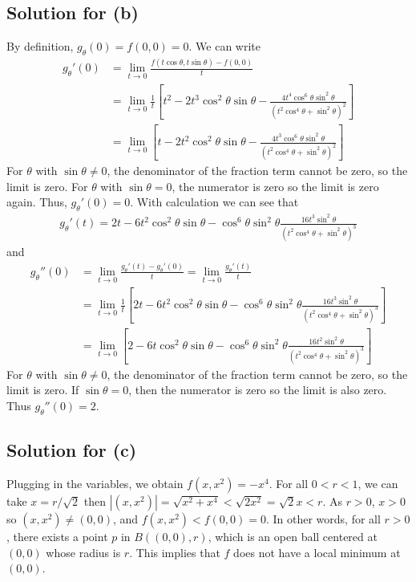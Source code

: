 \documentclass{scrartcl}
\begin{document}
\subsection{Solution for (b)}
By definition, \(g_\theta(0) = f(0, 0) = 0\). We can write
\begin{align*}
  g_\theta'(0)
  &= \lim_{t \to 0} \frac{f(t \cos \theta, t \sin \theta) - f(0, 0)}{t} \\
  &= \lim_{t \to 0}
    \frac{1}{t}
      \left[ t^2 - 2t^3 \cos^2 \theta \sin \theta
        - \frac{4t^4 \cos^6 \theta \sin^2 \theta}
        {(t^2 \cos^4 \theta + \sin^2 \theta)^2} \right] \\
  &= \lim_{t \to 0}
    \left[ t - 2t^2 \cos^2 \theta \sin \theta
      - \frac{4t^3 \cos^6 \theta \sin^2 \theta}
        {(t^2 \cos^4 \theta + \sin^2 \theta)^2}\right]
\end{align*}
For \(\theta\) with \(\sin \theta \not = 0\), the denominator of the fraction
term cannot be zero, so the limit is zero. For \(\theta\) with \(\sin \theta =
0\), the numerator is zero so the limit is zero again. Thus, \(g_\theta'(0) =
0\). With calculation we can see that
\begin{align*}
  g_\theta'(t)
  = 2t - 6t^2 \cos^2 \theta \sin \theta - \cos^6 \theta \sin^2 \theta
    \frac{16t^3 \sin^2 \theta}{(t^2 \cos^4 \theta + \sin^2 \theta)^3}
\end{align*}
and
\begin{align*}
  g_\theta''(0)
  &= \lim_{t \to 0} \frac{g_\theta'(t) - g_\theta'(0)}{t}
  = \lim_{t \to 0} \frac{g_\theta'(t)}{t} \\
  &= \lim_{t \to 0} \frac{1}{t}
    \left[ 2t - 6t^2 \cos^2 \theta \sin \theta - \cos^6 \theta \sin^2 \theta
      \frac{16t^3 \sin^2 \theta}
      {(t^2 \cos^4 \theta + \sin^2 \theta)^3} \right] \\
  &= \lim_{t \to 0}
    \left[ 2 - 6t \cos^2 \theta \sin \theta - \cos^6 \theta \sin^2 \theta
      \frac{16t^2 \sin^2 \theta}{(t^2 \cos^4 \theta + \sin^2 \theta)^3} \right]
\end{align*}
For \(\theta\) with \(\sin \theta \not = 0\), the denominator of the fraction
term cannot be zero, so the limit is zero. If \(\sin \theta = 0\), then the
numerator is zero so the limit is also zero. Thus \(g_\theta''(0) = 2\).

\subsection{Solution for (c)}
Plugging in the variables, we obtain \(f(x, x^2) = -x^4\). For all \(0 < r <
1\), we can take \(x = r / \sqrt{2}\) then \(|(x, x^2)| = \sqrt{x^2 + x^4} <
\sqrt{2x^2} = \sqrt{2} x < r\). As \(r > 0\), \(x > 0\) so \((x, x^2) \not =
(0, 0)\), and \(f(x, x^2) < f(0, 0) = 0\). In other words, for all \(r > 0\),
there exists a point \(p\) in \(B((0, 0), r)\), which is an open ball centered
at \((0, 0)\) whose radius is \(r\). This implies that \(f\) does not have a
local minimum at \((0, 0)\).
\end{document}
